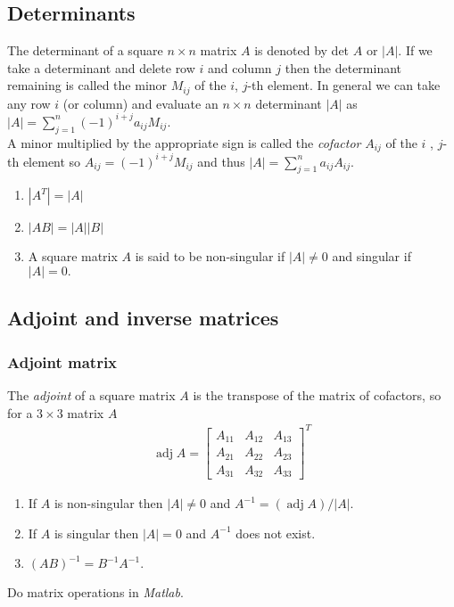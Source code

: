 \documentclass[12pt,a4paper,fleqn]{mycalc}
\begin{document}
	\subsection{Determinants}
	The determinant of a square $ n \times n $ matrix $ A $ is denoted by det $ A $ or $ | A |. $ If we take a determinant and delete row $ i $ and column $ j $ then the determinant remaining is called the minor $ M_{ij} $ of the $ i $, $ j $-th element. In general we can take any row $ i $ (or column) and evaluate an $ n \times n $ determinant $ | A | $ as $ |A|=\sum_{j=1}^{n}(-1)^{i+j}a_{ij}M_{ij}. $\\
	A minor multiplied by the appropriate sign is called the \emph{cofactor} $ A_{ij} $ of the $ i $ , $ j $-th element so $ A_{ij} = (-1)^{i+j} M_{ij} $ and thus $ |A|=\sum_{j=1}^{n}a_{ij}A_{ij}. $
	\begin{tcolorbox}[title={Some useful properties}]
		\begin{enumerate}[i]
			\item $ |A^{T}|=|A| $
			\item $ |AB|=|A||B| $
			\item A square matrix $ A $ is said to be non-singular if $ | A | \neq 0 $ and singular if $ | A | = 0. $
		\end{enumerate}
	\end{tcolorbox}
	\subsection{Adjoint and inverse matrices}
	\subsubsection{Adjoint matrix}
	The \emph{adjoint} of a square matrix $ A $ is the transpose of the matrix of cofactors, so for a $ 3 \times 3 $ matrix $ A $
	\begin{align*}
	\operatorname{adj} A=\begin{bmatrix}
	A_{11} & A_{12} & A_{13}\\
	A_{21} & A_{22} & A_{23}\\
	A_{31} & A_{32} & A_{33}
	\end{bmatrix}^{T}
	\end{align*}
	\begin{tcolorbox}[title={Properties}]
		\begin{enumerate}[i]
			\item If $ A $ is non-singular then $ |A | \neq 0 $ and $ A^{-1} = (\operatorname{adj} A)/|A |. $
			\item If $ A $ is singular then $ |A | = 0 $ and $ A^{-1} $ does not exist.
			\item $ (AB)^{-1} = B^{-1}A^{-1}. $
		\end{enumerate}
	\end{tcolorbox}
	\begin{tcolorbox}[title={Matlab Practice}]
		Do matrix operations in \emph{Matlab}.
	\end{tcolorbox}
\end{document}
